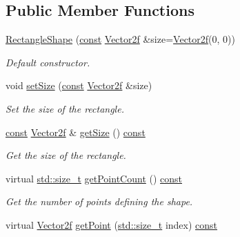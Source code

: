 \subsection*{Public Member Functions}
\begin{DoxyCompactItemize}
\item 
\hyperlink{classsf_1_1_rectangle_shape_a83a2be157ebee85c95ed491c3e78dd7c}{Rectangle\-Shape} (\hyperlink{term__entry_8h_a57bd63ce7f9a353488880e3de6692d5a}{const} \hyperlink{namespacesf_a80cea3c46537294fd1d8d428566ad8b2}{Vector2f} \&size=\hyperlink{namespacesf_a80cea3c46537294fd1d8d428566ad8b2}{Vector2f}(0, 0))
\begin{DoxyCompactList}\small\item\em Default constructor. \end{DoxyCompactList}\item 
void \hyperlink{classsf_1_1_rectangle_shape_a5c65d374d4a259dfdc24efdd24a5dbec}{set\-Size} (\hyperlink{term__entry_8h_a57bd63ce7f9a353488880e3de6692d5a}{const} \hyperlink{namespacesf_a80cea3c46537294fd1d8d428566ad8b2}{Vector2f} \&size)
\begin{DoxyCompactList}\small\item\em Set the size of the rectangle. \end{DoxyCompactList}\item 
\hyperlink{term__entry_8h_a57bd63ce7f9a353488880e3de6692d5a}{const} \hyperlink{namespacesf_a80cea3c46537294fd1d8d428566ad8b2}{Vector2f} \& \hyperlink{classsf_1_1_rectangle_shape_acaacbaee87c38a526a9d895742faab54}{get\-Size} () \hyperlink{term__entry_8h_a57bd63ce7f9a353488880e3de6692d5a}{const} 
\begin{DoxyCompactList}\small\item\em Get the size of the rectangle. \end{DoxyCompactList}\item 
virtual \hyperlink{nc__alloc_8h_a7b60c5629e55e8ec87a4547dd4abced4}{std\-::size\-\_\-t} \hyperlink{classsf_1_1_rectangle_shape_a22d960c8122c74682b6ab4e6cf4ef1aa}{get\-Point\-Count} () \hyperlink{term__entry_8h_a57bd63ce7f9a353488880e3de6692d5a}{const} 
\begin{DoxyCompactList}\small\item\em Get the number of points defining the shape. \end{DoxyCompactList}\item 
virtual \hyperlink{namespacesf_a80cea3c46537294fd1d8d428566ad8b2}{Vector2f} \hyperlink{classsf_1_1_rectangle_shape_a335ced9de019b381955d50afdacf057c}{get\-Point} (\hyperlink{nc__alloc_8h_a7b60c5629e55e8ec87a4547dd4abced4}{std\-::size\-\_\-t} index) \hyperlink{term__entry_8h_a57bd63ce7f9a353488880e3de6692d5a}{const} 

\end{DoxyCompactItemize}
